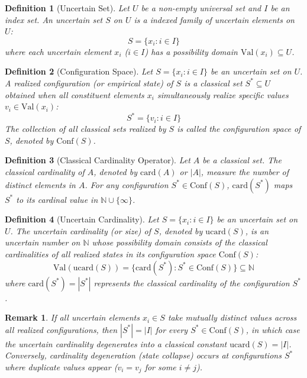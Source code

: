 \documentclass[a4paper,14pt, twoside]{memoir}
\newtheorem{definition}{Definition}[chapter]
\newtheorem{remark}{Remark}[chapter]
\begin{document}
	\begin{definition}[Uncertain Set]
		Let $U$ be a non-empty universal set and $I$ be an index set. An uncertain set $S$ on $U$ is a indexed family of uncertain elements on $U$:
		\[
		S = \{x_i : i \in I\}
		\]
		where each uncertain element $x_i$ ($i \in I$) has a possibility domain $\mathrm{Val}(x_i) \subseteq U$.
	\end{definition}
	
	\begin{definition}[Configuration Space]
		Let $S = \{x_i : i \in I\}$ be an uncertain set on $U$. A realized configuration (or empirical state) of $S$ is a classical set $S^* \subseteq U$ obtained when all constituent elements $x_i$ simultaneously realize specific values $v_i \in \mathrm{Val}(x_i)$:
		\[
		S^* = \{v_i : i \in I\}
		\]
		The collection of all classical sets realized by $S$ is called the configuration space of $S$, denoted by $\mathrm{Conf}(S)$.
	\end{definition}
	
	\begin{definition}[Classical Cardinality Operator]
		Let $A$ be a classical set. The classical cardinality of $A$, denoted by $\mathrm{card}(A)$ or $|A|$, measure the number of distinct elements in $A$. For any configuration $S^* \in \mathrm{Conf}(S)$, $\mathrm{card}(S^*)$ maps $S^*$ to its cardinal value in $\mathbb{N} \cup \{\infty\}$.
	\end{definition}
	
	\begin{definition}[Uncertain Cardinality]
		Let $S = \{x_i : i \in I\}$ be an uncertain set on $U$. The uncertain cardinality (or size) of $S$, denoted by $\mathrm{ucard}(S)$, is an uncertain number on $\mathbb{N}$ whose possibility domain consists of the classical cardinalities of all realized states in its configuration space $\mathrm{Conf}(S)$:
		\[
		\mathrm{Val}(\mathrm{ucard}(S)) = \{ \mathrm{card}(S^*) : S^* \in \mathrm{Conf}(S) \} \subseteq \mathbb{N}
		\]
		where $\mathrm{card}(S^*) = |S^*|$ represents the classical cardinality of the configuration $S^*$.
	\end{definition}
	
	\begin{remark}
		If all uncertain elements $x_i \in S$ take mutually distinct values across all realized configurations, then $|S^*| = |I|$ for every $S^* \in \mathrm{Conf}(S)$, in which case the uncertain cardinality degenerates into a classical constant $\mathrm{ucard}(S) = |I|$. Conversely, cardinality degeneration (state collapse) occurs at configurations $S^*$ where duplicate values appear ($v_i = v_j$ for some $i \neq j$).
	\end{remark}
	
\end{document}
